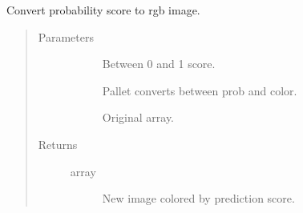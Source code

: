 \documentclass[letterpaper,10pt,english]{sphinxmanual}
\begin{document}
\begin{fulllineitems}
\label{\detokenize{index:pathflowai.visualize.prob2rbg}}
Convert probability score to rgb image.
\begin{quote}\begin{description}
\item[{Parameters}] \leavevmode\begin{description}
\item[{}] \leavevmode
Between 0 and 1 score.

\item[{}] \leavevmode
Pallet converts between prob and color.

\item[{}] \leavevmode
Original array.

\end{description}

\item[{Returns}] \leavevmode\begin{description}
\item[{array}] \leavevmode
New image colored by prediction score.

\end{description}

\end{description}\end{quote}

\end{fulllineitems}

\end{document}
